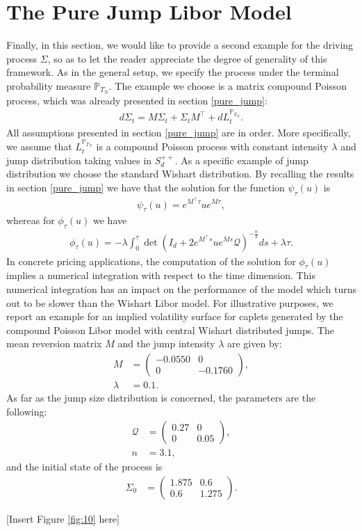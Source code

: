 \section{The Pure Jump Libor Model}
Finally, in this section, we would like to provide a second example for the driving process $\Sigma$, so as to let the reader appreciate the degree of generality of this framework.
As in the general setup, we specify the process under the terminal probability measure $\mathbb{P}_{T_N}$. The example we choose is a matrix compound Poisson process, which was already presented in section \ref{pure_jump}:
\begin{align}
d\Sigma_t=M\Sigma_t+\Sigma_tM^{\top}+dL_t^{\mathbb{P}_{T_N}}.
\end{align}
All assumptions presented in section \ref{pure_jump} are in order. More specifically, we assume that $L_t^{\mathbb{P}_{T_N}}$ is a compound Poisson process with constant intensity $\lambda$ and jump distribution taking values in $S_d^{++}$. As a specific example of jump distribution we choose the standard Wishart distribution. By recalling the results in section \ref{pure_jump} we have that the solution for the function $\psi_\tau(u)$ is
\begin{align}
\psi_\tau(u)=e^{M^{\top}\tau}ue^{M\tau},
\end{align}
whereas for $\phi_\tau(u)$ we have
\begin{align}
\phi_\tau(u)=-\lambda\int_{0}^{\tau}{\det\left(I_d+2e^{M^{\top}s}ue^{Ms}\mathcal{Q}\right)^{-\frac{n}{2}}ds}+\lambda \tau.
\end{align}
In concrete pricing applications, the computation of the solution for $\phi_\tau(u)$ implies a numerical integration with respect to the time dimension. This numerical integration has an impact on the performance of the model which turns out to be slower than the Wishart Libor model. For illustrative purposes, we report an example for an implied volatility surface for caplets generated by the compound Poisson Libor model with central Wishart distributed jumps.
The mean reversion matrix $M$ and the jump intensity $\lambda$ are given by:
\begin{align}
M&=\left(\begin{array}{cc} -0.0550&0\\ 0& -0.1760\end{array}\right),\nonumber\\
\lambda&=0.1\nonumber.
\end{align}
As far as the jump size distribution is concerned, the parameters are the following:
\begin{align}
\mathcal{Q}&=\left(\begin{array}{cc} 0.27&0\\ 0& 0.05\end{array}\right),\nonumber\\
n&=3.1, \nonumber
\end{align}
and the initial state of the process is
\begin{align*}
\Sigma_0&=\left(\begin{array}{cc} 1.875&0.6\\ 0.6& 1.275\end{array}\right).
\end{align*}

\begin{center}
[Insert Figure \ref{fig:10}  here]
\end{center}
